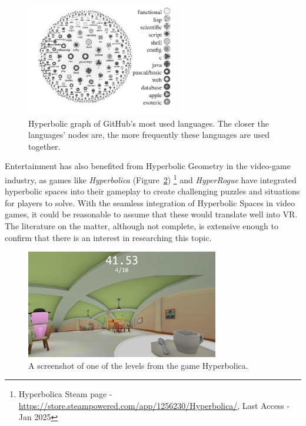 \begin{figure}[t]
    \centering
     \includegraphics[width=0.6\textwidth]{NOVAthesisFiles/Images/papers/github.png}
     \caption{Hyperbolic graph of GitHub's most used languages. The closer the languages' nodes are, the more frequently these 
     languages are used together.\cite{Celiska2017}}
    \label{fig:github}
 \end{figure}

Entertainment has also benefited from Hyperbolic Geometry in the video-game industry, as games like \textit{Hyperbolica} (Figure~\ref{fig:hyperbolica})
\footnote{Hyperbolica Steam page - \href{https://store.steampowered.com/app/1256230/Hyperbolica/}{https://store.steampowered.com/app/1256230/Hyperbolica/}, Last Access - Jan 2025 } 
and \textit{HyperRogue} \cite{Eryk2017}
have integrated hyperbolic spaces into their gameplay to create challenging puzzles and situations for players to solve. 
With the seamless integration of Hyperbolic Spaces in video games, 
it could be reasonable to assume that these would translate well into \gls{VR}. The literature on the matter, although not complete, 
is extensive enough to confirm that there is an interest in researching this topic.

\begin{figure}[b]
    \centering
     \includegraphics[width=0.75\textwidth]{NOVAthesisFiles/Images/papers/hyperbolica.png}
     \caption{A screenshot of one of the levels from the game Hyperbolica.}
    \label{fig:hyperbolica}
 \end{figure}

